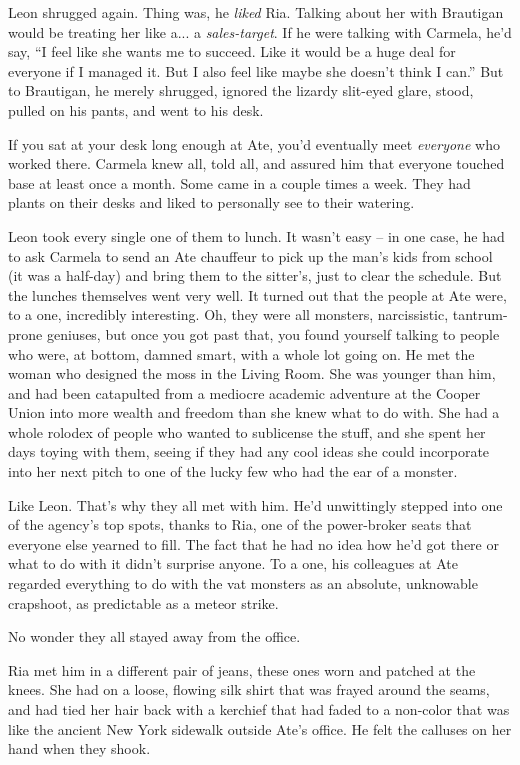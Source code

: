Leon shrugged again. Thing was, he \emph{liked} Ria. Talking about her 
with Brautigan would be treating her like a... a \emph{sales-target}. 
If he were talking with Carmela, he'd say, “I feel like she wants me 
to succeed. Like it would be a huge deal for everyone if I managed it. 
But I also feel like maybe she doesn't think I can.” But to 
Brautigan, he merely shrugged, ignored the lizardy slit-eyed glare, 
stood, pulled on his pants, and went to his desk.

\tb

If you sat at your desk long enough at Ate, you'd eventually meet 
\emph{everyone} who worked there. Carmela knew all, told all, and 
assured him that everyone touched base at least once a month. Some came 
in a couple times a week. They had plants on their desks and liked to 
personally see to their watering.

Leon took every single one of them to lunch. It wasn't easy -- in one 
case, he had to ask Carmela to send an Ate chauffeur to pick up the 
man's kids from school (it was a half-day) and bring them to the 
sitter's, just to clear the schedule. But the lunches themselves went 
very well. It turned out that the people at Ate were, to a one, 
incredibly interesting. Oh, they were all monsters, narcissistic, 
tantrum-prone geniuses, but once you got past that, you found yourself 
talking to people who were, at bottom, damned smart, with a whole lot 
going on. He met the woman who designed the moss in the Living Room. 
She was younger than him, and had been catapulted from a mediocre 
academic adventure at the Cooper Union into more wealth and freedom 
than she knew what to do with. She had a whole rolodex of people who 
wanted to sublicense the stuff, and she spent her days toying with 
them, seeing if they had any cool ideas she could incorporate into her 
next pitch to one of the lucky few who had the ear of a monster.

Like Leon. That's why they all met with him. He'd unwittingly stepped 
into one of the agency's top spots, thanks to Ria, one of the 
power-broker seats that everyone else yearned to fill. The fact that he 
had no idea how he'd got there or what to do with it didn't surprise 
anyone. To a one, his colleagues at Ate regarded everything to do with 
the vat monsters as an absolute, unknowable crapshoot, as predictable 
as a meteor strike.

No wonder they all stayed away from the office.

\tb

Ria met him in a different pair of jeans, these ones worn and patched 
at the knees. She had on a loose, flowing silk shirt that was frayed 
around the seams, and had tied her hair back with a kerchief that had 
faded to a non-color that was like the ancient New York sidewalk 
outside Ate's office. He felt the calluses on her hand when they shook.


